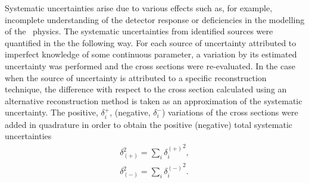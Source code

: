 Systematic uncertainties arise due to various effects such as, for example, incomplete understanding of the detector response or deficiencies in the modelling of the \ep~physics. The systematic uncertainties from identified sources were quantified in the the following way. For each source of uncertainty attributed to imperfect knowledge of some continuous parameter, a variation by its estimated uncertainty was performed and the cross sections were re-evaluated. In the case when the source of uncertainty is attributed to a specific reconstruction technique, the difference with respect to the cross section calculated using an alternative reconstruction method is taken as an approximation of the systematic uncertainty. The positive, $\delta^+_i$, (negative, $\delta^-_i$) variations of the cross sections were added in quadrature in order to obtain the positive (negative) total systematic uncertainties
\[
	\begin{aligned}
		\delta_{\left( +\right)}^{2} = \sum_i{\mbox{$\delta_i^{\left( +\right)}$}^2},\\
		\delta_{\left( -\right)}^{2} = \sum_i{\mbox{$\delta_i^{\left( -\right)}$}^2}.
	\end{aligned}
\]

